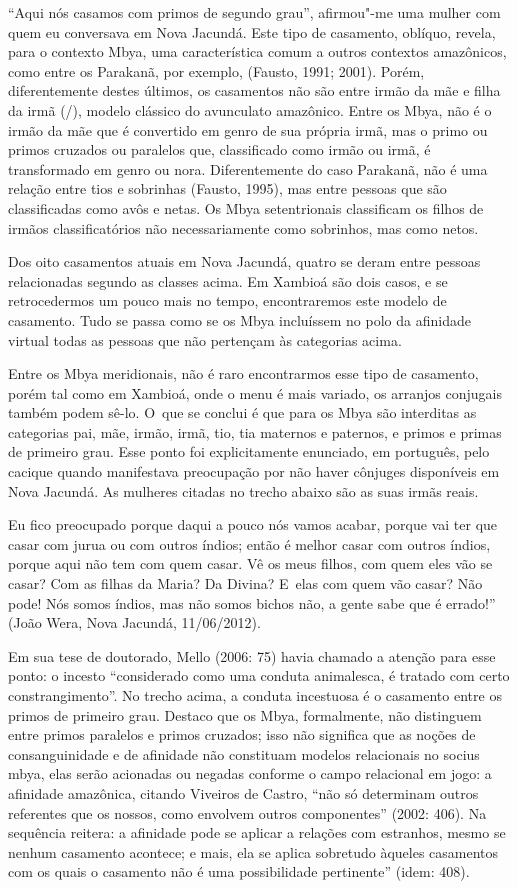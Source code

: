 ``Aqui nós casamos com primos de segundo grau'', afirmou"-me uma mulher com
quem eu conversava em Nova Jacundá. Este tipo de casamento, oblíquo,
revela, para o contexto Mbya, uma característica comum a outros
contextos amazônicos, como entre os Parakanã, por exemplo, (Fausto,
1991; 2001). Porém, diferentemente destes últimos, os casamentos não
são entre irmão da mãe e filha da irmã (/), modelo clássico do
avunculato amazônico. Entre os Mbya, não é o irmão da mãe que é
convertido em genro de sua própria irmã, mas o primo ou primos cruzados
ou paralelos que, classificado como irmão ou irmã, é transformado em
genro ou nora. Diferentemente do caso Parakanã, não é uma relação entre
tios e sobrinhas (Fausto, 1995), mas entre pessoas que são
classificadas como avôs e netas. Os Mbya setentrionais classificam os
filhos de irmãos classificatórios não necessariamente como sobrinhos,
mas como netos.

Dos oito casamentos atuais em Nova Jacundá, quatro se deram entre
pessoas relacionadas segundo as classes acima. Em Xambioá são dois
casos, e se retrocedermos um pouco mais no tempo, encontraremos este
modelo de casamento. Tudo se passa como se os Mbya incluíssem no polo
da afinidade virtual todas as pessoas que não pertençam às categorias
acima.

Entre os Mbya meridionais, não é raro encontrarmos esse tipo de
casamento, porém tal como em Xambioá, onde o menu é mais variado, os
arranjos conjugais também podem sê-lo. O~que se conclui é que para os
Mbya são interditas as categorias pai, mãe, irmão, irmã, tio, tia
maternos e paternos, e primos e primas de primeiro grau. Esse ponto foi
explicitamente enunciado, em português, pelo cacique quando manifestava
preocupação por não haver cônjuges disponíveis em Nova Jacundá. As
mulheres citadas no trecho abaixo são as suas irmãs reais.

Eu fico preocupado porque daqui a pouco nós vamos acabar, porque vai ter
que casar com jurua ou com outros índios; então é melhor casar com
outros índios, porque aqui não tem com quem casar. Vê os meus filhos,
com quem eles vão se casar? Com as filhas da Maria? Da Divina? E~elas
com quem vão casar? Não pode! Nós somos índios, mas não somos bichos
não, a gente sabe que é errado!'' (João Wera, Nova Jacundá, 11/06/2012).

Em sua tese de doutorado, Mello (2006: 75) havia chamado a atenção para
esse ponto: o incesto ``considerado como uma conduta animalesca, é
tratado com certo constrangimento''. No trecho acima, a conduta
incestuosa é o casamento entre os primos de primeiro grau. Destaco que
os Mbya, formalmente, não distinguem entre primos paralelos e primos
cruzados; isso não significa que as noções de consanguinidade e de
afinidade não constituam modelos relacionais no socius mbya, elas serão
acionadas ou negadas conforme o campo relacional em jogo: a afinidade
amazônica, citando Viveiros de Castro, ``não só determinam outros
referentes que os nossos, como envolvem outros componentes'' (2002: 406).
Na sequência reitera: a afinidade pode se aplicar a relações com
estranhos, mesmo se nenhum casamento acontece; e mais, ela se aplica
sobretudo àqueles casamentos com os quais o casamento não é uma
possibilidade pertinente'' (idem: 408).


